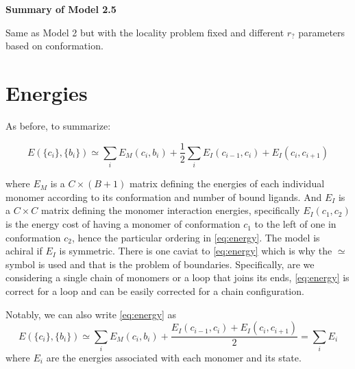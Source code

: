 \documentclass[11pt]{article}
\newcommand\set[1]{\ensuremath{\{#1\}}}
\begin{document}
\begin{center}
    \LARGE
    \textbf{Summary of Model 2.5}
    \vspace{1em}
\end{center}

Same as Model 2 but with the locality problem fixed and different $r_?$ parameters based on conformation.

\section{Energies}\label{sec:energies}
As before, to summarize:
\begin{tcolorbox}
    \begin{equation}\label{eq:energy}
        E(\set{c_i}, \set{b_i}) \simeq \sum_i E_M(c_i, b_i) + \frac{1}{2} \sum_i E_I(c_{i-1}, c_i) + E_I(c_i, c_{i+1})
    \end{equation}
\end{tcolorbox}
where $E_M$ is a $C{\times}(B+1)$ matrix defining the energies of each individual monomer according to its conformation and number of bound ligands.
And $E_I$ is a $C{\times}C$ matrix defining the monomer interaction energies, specifically $E_I(c_1, c_2)$ is the energy cost of having a monomer of conformation $c_1$ to the left of one in conformation $c_2$, hence the particular ordering in \cref{eq:energy}.
The model is achiral if $E_I$ is symmetric.
There is one caviat to \cref{eq:energy} which is why the $\simeq$ symbol is used and that is the problem of boundaries.
Specifically, are we considering a single chain of monomers or a loop that joins its ends, \cref{eq:energy} is correct for a loop and can be easily corrected for a chain configuration.

Notably, we can also write \cref{eq:energy} as
\begin{equation}\label{eq:energy_ind}
    E(\set{c_i}, \set{b_i}) \simeq \sum_i E_M(c_i, b_i) + \frac{E_I(c_{i-1}, c_i) + E_I(c_i, c_{i+1})}{2} = \sum_i E_{i}
\end{equation}
where $E_i$ are the energies associated with each monomer and its state.
\end{document}
